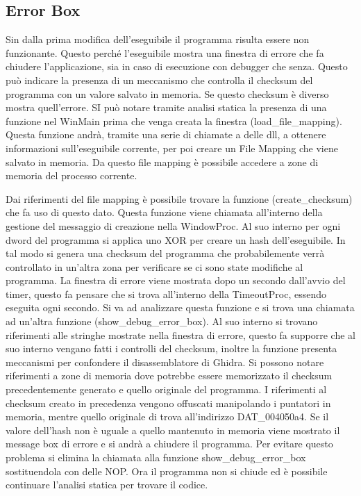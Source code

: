 \documentclass[a4paper,12pt]{article}
\begin{document}
\subsection{Error Box}
Sin dalla prima modifica dell'eseguibile il programma risulta essere non funzionante. Questo perché l'eseguibile mostra una finestra di errore che fa chiudere l'applicazione, sia in caso di esecuzione con debugger che senza.  Questo può indicare la presenza di un meccanismo che controlla il checksum del programma con un valore salvato in memoria. Se questo checksum è diverso mostra quell'errore. SI può notare tramite analisi statica la presenza di una funzione nel WinMain prima che venga creata la finestra (load\_file\_mapping). Questa funzione andrà, tramite una serie di chiamate a delle dll, a ottenere informazioni sull'eseguibile corrente, per poi creare un File Mapping che viene salvato in memoria. Da questo file mapping è possibile accedere a zone di memoria del processo corrente. 

Dai riferimenti del file mapping è possibile trovare la funzione (create\_checksum) che fa uso di questo dato. Questa funzione viene chiamata all'interno della gestione del messaggio di creazione nella WindowProc. Al suo interno per ogni dword del programma si applica uno XOR per creare un hash dell'eseguibile.  In tal modo si genera una checksum del programma che probabilemente verrà controllato in un'altra zona per verificare se ci sono state modifiche al programma.  La finestra di errore viene mostrata dopo un secondo dall'avvio del timer, questo fa pensare che si trova all'interno della TimeoutProc, essendo eseguita ogni secondo. Si va ad analizzare questa funzione e si trova una chiamata ad un'altra funzione (show\_debug\_error\_box). Al suo interno si trovano riferimenti alle stringhe mostrate nella finestra di errore, questo fa supporre che al suo interno vengano fatti i controlli del checksum, inoltre la funzione presenta meccanismi per confondere il disassemblatore di Ghidra. 
Si possono notare riferimenti a zone di memoria  dove potrebbe essere memorizzato il checksum precedentemente generato e quello originale del programma. I riferimenti al checksum creato in precedenza vengono offuscati  manipolando i puntatori in memoria, mentre quello originale di trova all'indirizzo DAT\_004050a4. Se il valore dell'hash non è uguale a quello mantenuto in memoria viene mostrato il message box di errore e si andrà a chiudere il programma. Per evitare questo problema si elimina la chiamata alla funzione show\_debug\_error\_box sostituendola con delle NOP. Ora il programma non si chiude ed è possibile continuare l'analisi statica per trovare il codice.
\end{document}
